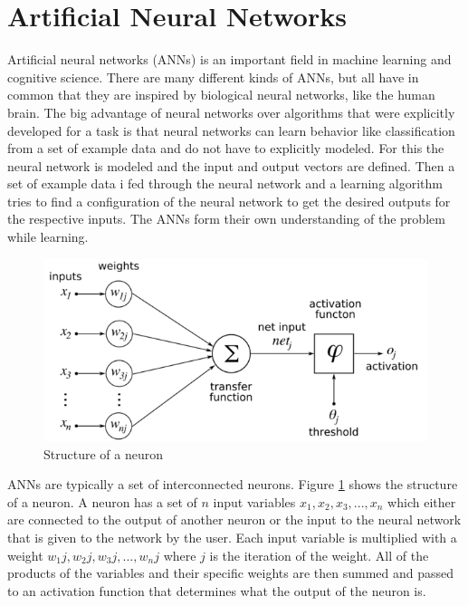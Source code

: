 \section{Artificial Neural Networks}
\label{sec:ann}

Artificial neural networks (ANNs) is an important field in machine learning and cognitive science. There are many different kinds of ANNs, but all have in common that they are inspired by biological neural networks, like the human brain. The big advantage of neural networks over algorithms that were explicitly developed for a task is that neural networks can learn behavior like classification from a set of example data and do not have to explicitly modeled. For this the neural network is modeled and the input and output vectors are defined. Then a set of example data i fed through the neural network and a learning algorithm tries to find a configuration of the neural network to get the desired outputs for the respective inputs. The ANNs form their own understanding of the problem while learning.

\begin{figure}[ht]
	\centering
  \includegraphics[width=15cm]{figures/neuron_structure}
	\caption[Structure of a neuron]{Structure of a neuron \protect\footnotemark}
	\label{neuron}
\end{figure}

ANNs are typically a set of interconnected neurons. Figure \ref{neuron} shows the structure of a neuron. A neuron has a set of $n$ input variables $x_1, x_2, x_3, ..., x_n$ which either are connected to the output of another neuron or the input to the neural network that is given to the network by the user. Each input variable is multiplied with a weight $w_1j, w_2j, w_3j, ..., w_nj$ where $j$ is the iteration of the weight. All of the products of the variables and their specific weights are then summed and passed to an activation function that determines what the output of the neuron is.

